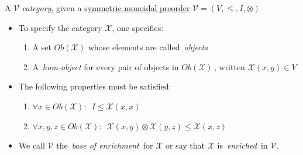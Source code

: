 A $\mathcal{V}$ \emph{category}, given a \href{doc/1 math/Seven Sketches in Compositionality/Chapter 2: Resource theories/2 Symmetric monoidal preorders/1 Definition and first examples/1 Symmetric monoidal structure on a preorder}{symmetric monoidal preorder} $\mathcal{V}=(V,\leq,I,\otimes)$

\begin{itemize}
    \item To specify the category $\mathcal{X}$, one specifies:
          \begin{enumerate}
            \item A set $Ob(\mathcal{X})$ whose elements are called \,\emph{objects}\,
            \item A \,\emph{hom-object} for every pair of objects in $Ob(\mathcal{X})$\,, written $\mathcal{X}(x,y) \in V$
          \end{enumerate}
    \item The following properties must be satisfied:
          \begin{enumerate}
            \item $\forall x \in Ob(\mathcal{X}):$ \,$I \leq \mathcal{X}(x,x)$\,
            \item $\forall x,y,z \in Ob(\mathcal{X}):$ \,$\mathcal{X}(x,y)\otimes\mathcal{X}(y,z) \leq \mathcal{X}(x,z)$\,
          \end{enumerate}
    \item We call $\mathcal{V}$ the\, \emph{base of enrichment}\, for $\mathcal{X}$ or say that $\mathcal{X}$ is\, \emph{enriched}\, in $\mathcal{V}$.
  \end{itemize}
